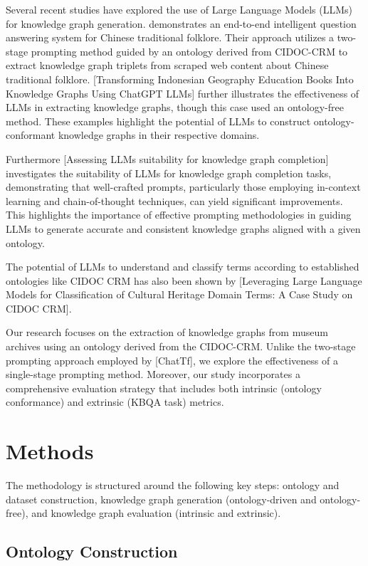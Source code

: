 \documentclass[a4, conference]{IEEEtran}
\begin{document}
Several recent studies have explored the use of Large Language Models (LLMs) for knowledge graph generation. \cite{xu2024chattf} demonstrates an end-to-end intelligent question answering system for Chinese traditional folklore. Their approach utilizes a two-stage prompting method guided by an ontology derived from CIDOC-CRM to extract knowledge graph triplets from scraped web content about Chinese traditional folklore. [Transforming Indonesian Geography Education Books Into Knowledge Graphs Using ChatGPT LLMs] further illustrates the effectiveness of LLMs in extracting knowledge graphs, though this case used an ontology-free method. These examples highlight the potential of LLMs to construct ontology-conformant knowledge graphs in their respective domains.

Furthermore [Assessing LLMs suitability for knowledge graph completion] investigates the suitability of LLMs for knowledge graph completion tasks, demonstrating that well-crafted prompts, particularly those employing in-context learning and chain-of-thought techniques, can yield significant improvements. This highlights the importance of effective prompting methodologies in guiding LLMs to generate accurate and consistent knowledge graphs aligned with a given ontology.

The potential of LLMs to understand and classify terms according to established ontologies like CIDOC CRM has also been shown by [Leveraging Large Language Models for Classification of Cultural Heritage Domain Terms: A Case Study on CIDOC CRM].

Our research focuses on the extraction of knowledge graphs from museum archives using an ontology derived from the CIDOC-CRM. Unlike the two-stage prompting approach employed by [ChatTf], we explore the effectiveness of a single-stage prompting method. Moreover, our study incorporates a comprehensive evaluation strategy that includes both intrinsic (ontology conformance) and extrinsic (KBQA task) metrics.

\section{Methods}

The methodology is structured around the following key steps: ontology and dataset construction, knowledge graph generation (ontology-driven and ontology-free), and knowledge graph evaluation (intrinsic and extrinsic).

\subsection{Ontology Construction}
\end{document}
